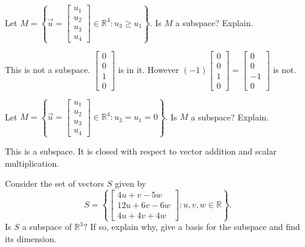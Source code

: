 \documentclass{ximera}
\begin{document}
\begin{problem}\label{prb:5.14} Let $M=\left\{ \vec{u}=\left[
\begin{array}{c}
u_{1} \\
u_{2} \\
u_{3} \\
u_{4}
\end{array}
\right] \in
\mathbb{R}^{4}:u_{3}\geq u_{1}\right\} .$ Is $M$ a subspace? Explain.
\begin{hint}
This
is not a subspace. $\left[ \begin{array}{r}
0 \\
0 \\
1 \\
0
\end{array}
\right] $ is in it. However $(-1) \left[ \begin{array}{r}
0 \\
0 \\
1 \\
0
\end{array}
\right]  = \left[ \begin{array}{r}
0 \\
0 \\
-1 \\
0
\end{array}
\right] $ is not.
\end{hint}
\end{problem}

\begin{problem}\label{prb:5.15} Let $M=\left\{ \vec{u}=\left[
\begin{array}{c}
u_{1} \\
u_{2} \\
u_{3} \\
u_{4}
\end{array}\right] \in
\mathbb{R}^{4}:u_{3}=u_{1}=0\right\} .$ Is $M$ a subspace? Explain.
\begin{hint}
This is a subspace. It is closed with respect to vector addition and scalar
multiplication.
\end{hint}
\end{problem}

\begin{problem}\label{prb:5.16} Consider the set of vectors $S$ given by
\begin{equation*}
S =
\left\{ \left[
\begin{array}{c}
4u+v-5w \\
12u+6v-6w \\
4u+4v+4w
\end{array}
\right] :u,v,w\in \mathbb{R}\right\} .
\end{equation*}
Is $S$ a subspace of $\mathbb{R}^{3}?$ If so, explain why,
give a basis for the subspace and find its dimension.
\end{problem}
\end{document}
